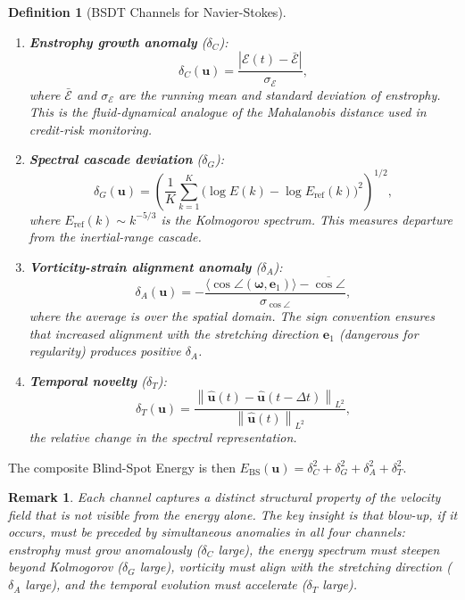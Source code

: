 \documentclass[12pt, a4paper]{article}
\newtheorem{definition}[theorem]{Definition}
\newtheorem{remark}[theorem]{Remark}
\newcommand{\norm}[1]{\left\| #1 \right\|}
\newcommand{\Ebs}{E_{\mathrm{BS}}}
\begin{document}
\begin{definition}[BSDT Channels for Navier-Stokes]\label{def:channels}
\mbox{}
\begin{enumerate}[label=(\alph*)]
\item \textbf{Enstrophy growth anomaly} ($\delta_C$):
  \begin{equation}
  \delta_C(\mathbf{u}) = \frac{|\mathcal{E}(t) - \bar{\mathcal{E}}|}
  {\sigma_{\mathcal{E}}},
  \end{equation}
  where $\bar{\mathcal{E}}$ and $\sigma_{\mathcal{E}}$ are the
  running mean and standard deviation of enstrophy.
  This is the fluid-dynamical analogue of the Mahalanobis distance
  used in credit-risk monitoring.

\item \textbf{Spectral cascade deviation} ($\delta_G$):
  \begin{equation}
  \delta_G(\mathbf{u}) = \left(\frac{1}{K}
  \sum_{k=1}^{K} \bigl(\log E(k) - \log E_{\mathrm{ref}}(k)\bigr)^2
  \right)^{1/2},
  \end{equation}
  where $E_{\mathrm{ref}}(k) \sim k^{-5/3}$ is the Kolmogorov spectrum.
  This measures departure from the inertial-range cascade.

\item \textbf{Vorticity-strain alignment anomaly} ($\delta_A$):
  \begin{equation}
  \delta_A(\mathbf{u}) = -\frac{\langle\cos\angle(\boldsymbol{\omega},
  \mathbf{e}_1)\rangle - \overline{\cos\angle}}
  {\sigma_{\cos\angle}},
  \end{equation}
  where the average is over the spatial domain.
  The sign convention ensures that \emph{increased} alignment with
  the stretching direction $\mathbf{e}_1$ (dangerous for regularity)
  produces positive $\delta_A$.

\item \textbf{Temporal novelty} ($\delta_T$):
  \begin{equation}
  \delta_T(\mathbf{u}) = \frac{\norm{\hat{\mathbf{u}}(t) - \hat{\mathbf{u}}(t - \Delta t)}_{L^2}}
  {\norm{\hat{\mathbf{u}}(t)}_{L^2}},
  \end{equation}
  the relative change in the spectral representation.
\end{enumerate}
\end{definition}

The composite Blind-Spot Energy is then
$\Ebs(\mathbf{u}) = \delta_C^2 + \delta_G^2 + \delta_A^2 + \delta_T^2$.

\begin{remark}
Each channel captures a distinct \emph{structural} property of the
velocity field that is not visible from the energy alone.
The key insight is that blow-up, if it occurs, must be preceded by
simultaneous anomalies in \emph{all four channels}: enstrophy must
grow anomalously ($\delta_C$ large), the energy spectrum must steepen
beyond Kolmogorov ($\delta_G$ large), vorticity must align with
the stretching direction ($\delta_A$ large), and the temporal
evolution must accelerate ($\delta_T$ large).
\end{remark}
\end{document}
